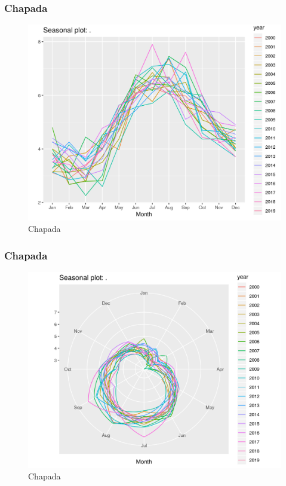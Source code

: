 \documentclass{beamer}
\begin{document}
\begin{frame}
	\frametitle{Chapada}
	\begin{figure}
		\centering
		\includegraphics[width=\textwidth]{season_plot}
		\caption{Chapada}
	\end{figure}
\end{frame}

\begin{frame}
	\frametitle{Chapada}
	\begin{figure}
		\centering
		\includegraphics[width=\textwidth]{season_plot_polar}
		\caption{Chapada}
	\end{figure}
\end{frame}
\end{document}
